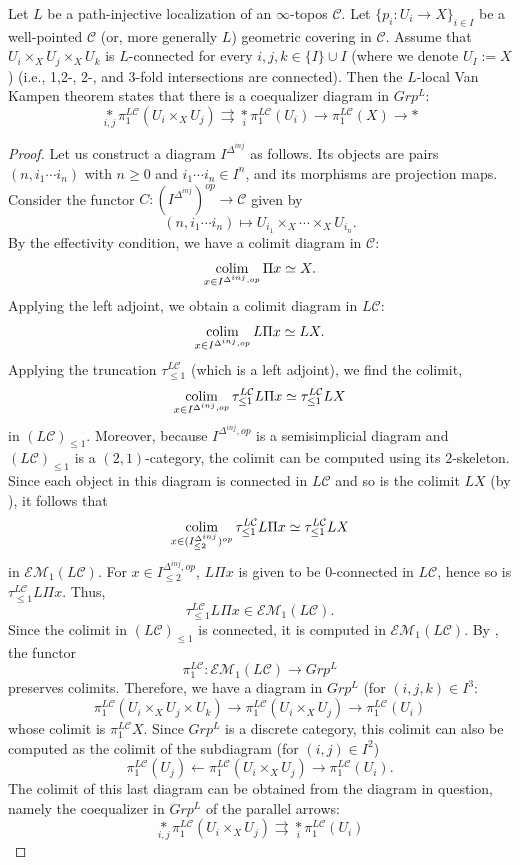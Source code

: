 \begin{thm}\label{L van campen}
Let $L$ be a path-injective localization of an $\infty$-topos $\mathcal{C}$. Let $\{p_i:U_i\to X\}_{i\in I}$ be a well-pointed $\mathcal{C}$ (or, more generally $L$) geometric covering in $\mathcal{C}$. Assume that $U_i\times_XU_j\times_XU_k$ is $L$-connected for every $i,j,k \in \{I\}\cup I$ (where we denote $U_I:=X$) (i.e., 1,2-, 2-, and 3-fold intersections are connected). Then the $L$-local Van Kampen theorem states that there is a coequalizer diagram in $Grp^L$:
$$\underset{i,j}{*}\pi_1^{L\mathcal{C}}({U_i\times_XU_j})\rightrightarrows \underset{i}{*}\pi_1^{L\mathcal{C}}({U_i})\to \pi_1^{L\mathcal{C}}(X)\to *$$
\end{thm}
\begin{proof}
Let us construct a diagram $I^{\Delta^{inj}}$ as follows. Its objects are pairs $(n,i_1\cdots i_n)$ with $n\geq 0$ and $i_1\cdots i_n\in I^n$, and its morphisms are projection maps. Consider the functor $C:(I^{\Delta^{inj}})^{{op}}\to \mathcal{C}$ given by $$(n,i_1\cdots i_n)\mapsto U_{i_1}\times_X\cdots\times _XU_{i_n}.$$ By the effectivity condition, we have a colimit diagram in $\mathcal{C}$: $$\operatorname*{colim}_{x\in I^{\Delta^{inj},op}}\Pi x\simeq X.$$ Applying the left adjoint, we obtain a colimit diagram in $L\mathcal{C}$: $$\operatorname*{colim}_{x\in I^{\Delta^{inj},op}}L\Pi x\simeq LX.$$ Applying the truncation $\tau_{\leq  1}^{L\mathcal{C}}$ (which is a left adjoint), we find the colimit, $$\operatorname*{colim}_{x\in I^{\Delta^{inj},op}}\tau_{\leq 1}^{L\mathcal{C}}L\Pi x\simeq \tau_{\leq 1}^{L\mathcal{C}}LX$$ in $(L\mathcal{C})_{\leq 1}$. Moreover, because $I^{\Delta^{inj},op}$ is a semisimplicial diagram and $(L\mathcal{C})_{\leq 1}$ is a $(2,1)$-category, the colimit can be computed using its $2$-skeleton. 
Since each object in this diagram is connected in $L\mathcal{C}$ and so is the colimit $LX$ (by ), it follows that  $$\operatorname*{colim}_{x\in ({I^{\Delta^{inj}}_{\leq 2}})^{op}}\tau_{\leq 1}^{L\mathcal{C}}L\Pi x\simeq \tau_{\leq 1}^{L\mathcal{C}}LX$$ in $\mathcal{EM}_1(L\mathcal{C})$. For $x\in I^{\Delta^{inj},op}_{\leq 2}$, $L\Pi x$ is given to be $0$-connected in $L\mathcal{C}$, hence so is $\tau_{\leq 1}^{L\mathcal{C}}L\Pi x$. Thus, $$\tau_{\leq 1}^{L\mathcal{C}}L\Pi x\in \mathcal{EM}_1(L\mathcal{C}).$$ Since the colimit in $(L\mathcal{C})_{\leq 1}$ is connected, it is computed in $\mathcal{EM}_1(L\mathcal{C})$. By , the functor $$\pi_1^{L\mathcal{C}}:\mathcal{EM}_1(L\mathcal{C})\to Grp^L$$ preserves colimits. Therefore, we have a diagram in $Grp^L$ (for $(i,j,k)\in I^3$:
$$\pi_1^{L\mathcal{C}}({U_i\times_XU_j}\times U_k)\to \pi_1^{L\mathcal{C}}({U_i\times_XU_j})\to\pi_1^{L\mathcal{C}}({U_i})$$ whose colimit is $\pi_1^{L\mathcal{C}}X$. Since $Grp^L$ is a discrete category, this colimit can also be computed as the colimit of the subdiagram (for $(i,j)\in I^2$)$$\pi_1^{L\mathcal{C}}({U_j})\leftarrow\pi_1^{L\mathcal{C}}({U_i\times_XU_j})\to\pi_1^{L\mathcal{C}}({U_i}).$$ The colimit of this last diagram can be obtained from the diagram in question, namely the coequalizer in $Grp^L$ of the parallel arrows: 
$$\underset{i,j}{*}\pi_1^{L\mathcal{C}}({U_i\times_XU_j})\rightrightarrows \underset{i}{*}\pi_1^{L\mathcal{C}}({U_i})$$
\end{proof}

